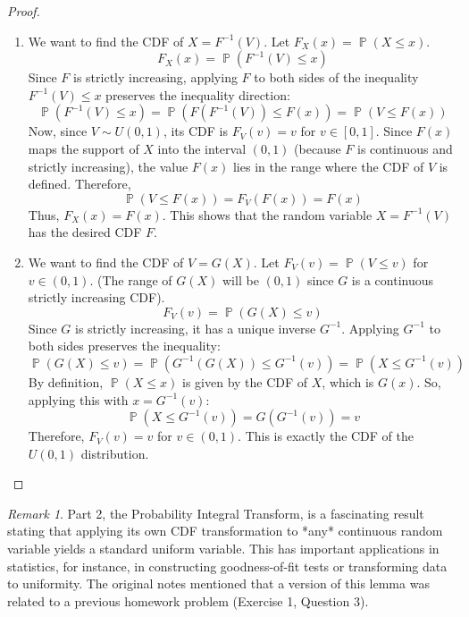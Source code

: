 \documentclass[11pt]{article}
\theoremstyle{definition}
\theoremstyle{remark}
\newtheorem{remark}[theorem]{Remark}
\DeclareMathOperator{\Prob}{\mathbb{P}} %
\begin{document}
\begin{proof}
\begin{enumerate}
    \item We want to find the CDF of $X = F^{-1}(V)$. Let $F_X(x) = \Prob(X \le x)$.
    \[ F_X(x) = \Prob(F^{-1}(V) \le x) \]
    Since $F$ is strictly increasing, applying $F$ to both sides of the inequality $F^{-1}(V) \le x$ preserves the inequality direction:
    \[ \Prob(F^{-1}(V) \le x) = \Prob(F(F^{-1}(V)) \le F(x)) = \Prob(V \le F(x)) \]
    Now, since $V \sim U(0, 1)$, its CDF is $F_V(v) = v$ for $v \in [0, 1]$. Since $F(x)$ maps the support of $X$ into the interval $(0, 1)$ (because $F$ is continuous and strictly increasing), the value $F(x)$ lies in the range where the CDF of $V$ is defined. Therefore,
    \[ \Prob(V \le F(x)) = F_V(F(x)) = F(x) \]
    Thus, $F_X(x) = F(x)$. This shows that the random variable $X=F^{-1}(V)$ has the desired CDF $F$.

    \item We want to find the CDF of $V = G(X)$. Let $F_V(v) = \Prob(V \le v)$ for $v \in (0, 1)$. (The range of $G(X)$ will be $(0, 1)$ since $G$ is a continuous strictly increasing CDF).
    \[ F_V(v) = \Prob(G(X) \le v) \]
    Since $G$ is strictly increasing, it has a unique inverse $G^{-1}$. Applying $G^{-1}$ to both sides preserves the inequality:
    \[ \Prob(G(X) \le v) = \Prob(G^{-1}(G(X)) \le G^{-1}(v)) = \Prob(X \le G^{-1}(v)) \]
    By definition, $\Prob(X \le x)$ is given by the CDF of $X$, which is $G(x)$. So, applying this with $x = G^{-1}(v)$:
    \[ \Prob(X \le G^{-1}(v)) = G(G^{-1}(v)) = v \]
    Therefore, $F_V(v) = v$ for $v \in (0, 1)$. This is exactly the CDF of the $U(0, 1)$ distribution.
\end{enumerate}
\end{proof}

\begin{remark}
Part 2, the Probability Integral Transform, is a fascinating result stating that applying its own CDF transformation to *any* continuous random variable yields a standard uniform variable. This has important applications in statistics, for instance, in constructing goodness-of-fit tests or transforming data to uniformity. The original notes mentioned that a version of this lemma was related to a previous homework problem (Exercise 1, Question 3).
\end{remark}
\end{document}
